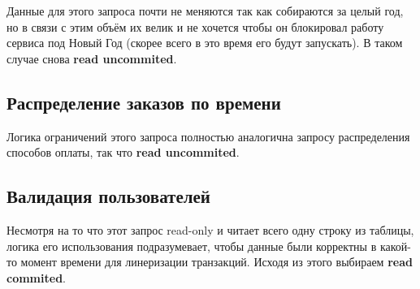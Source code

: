 \documentclass[fontsize=12pt]{article}
\begin{document}
Данные для этого запроса почти не меняются так как собираются за целый год, но в связи с этим объём их велик и не хочется чтобы он блокировал работу сервиса под Новый Год (скорее всего в это время его будут запускать). В таком случае снова \textbf{read uncommited}.

\subsection*{Распределение заказов по времени}

Логика ограничений этого запроса полностью аналогична запросу распределения способов оплаты, так что \textbf{read uncommited}.

\subsection*{Валидация пользователей}

Несмотря на то что этот запрос read-only и читает всего одну строку из таблицы, логика его использования подразумевает, чтобы данные были корректны в какой-то момент времени для линеризации транзакций. Исходя из этого выбираем \textbf{read commited}.
\end{document}
